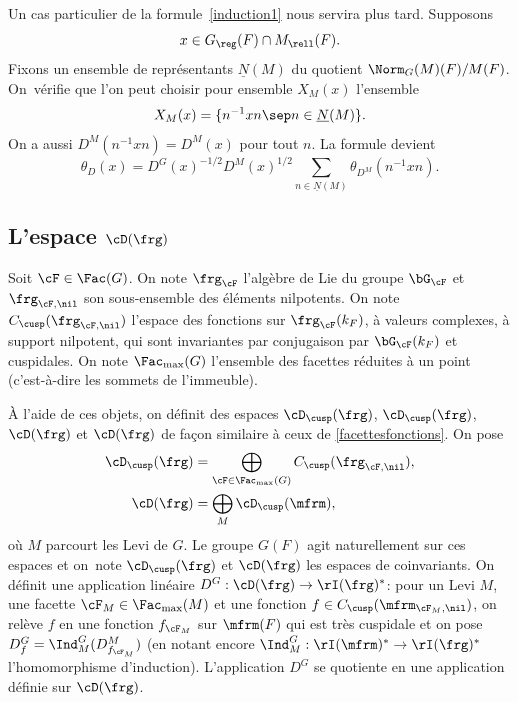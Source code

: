 Un cas particulier de la formule~\eqref{induction1} nous servira plus tard. Supposons
\[
x\in G_{\reg}(F)\cap M_{\rell}(F).
\]
Fixons un ensemble de représentants $\underline{N}(M)$ du quotient $\Norm_{G}(M)(F)/ M(F)$. On~véri\-fie que l'on peut choisir pour ensemble $X_{M}(x)$ l'ensemble
\[
X_{M}(x)=\{n^{-1}xn\sep n\in \underline{N}(M)\}.
\]
On a aussi $D^M(n^{-1}xn)=D^M(x)$ pour tout $n$. La formule devient
\begin{equation}\tag{3}\label{induction3}
\theta_{D}(x)=D^G(x)^{-1/2}D^M(x)^{1/2}\sum_{n\in \underline{N}(M)}\theta_{D^M}(n^{-1}xn).
\end{equation}

\subsection{L'espace \texorpdfstring{$\cD(\frg)$}{Dg}}\label{lespace}

Soit $\cF\in \Fac(G)$. On note $\boldsymbol{\frg}_{\cF}$ l'algèbre de Lie du groupe $\bG_{\cF}$ et $\boldsymbol{\frg}_{\cF,\nil}$ son sous-ensemble des éléments nilpotents. On note $C_{\cusp}(\boldsymbol{\frg}_{\cF,\nil})$ l'espace des fonctions sur $\boldsymbol{\frg}_{\cF}(k_{F})$, à valeurs complexes, à support nilpotent, qui sont invariantes par conjugaison par $\bG_{\cF}(k_{F})$ et cuspidales. On note $\Fac_{\max}(G)$ l'ensemble des facettes réduites à un point (c'est-à-dire les sommets de l'immeuble).

À l'aide de ces objets, on définit des espaces $\boldsymbol{\cD}_{\cusp}(\frg)$, $\cD_{\cusp}(\frg)$, $\boldsymbol{\cD}(\frg)$ et $\cD(\frg)$ de façon similaire à ceux de \ref{facettesfonctions}. On pose\vspace*{-3pt}
\begin{align*}
\boldsymbol{\cD}_{\cusp}(\frg)&=\bigoplus_{\cF\in \Fac_{\max}(G)}C_{\cusp}(\boldsymbol{\frg}_{\cF,\nil}),
\\
\boldsymbol{\cD}(\frg)&=\bigoplus_{M}\boldsymbol{\cD}_{\cusp}(\mfrm),
\end{align*}
où $M$ parcourt les Levi de $G$. Le groupe $G(F)$ agit naturellement sur ces espaces et on~note $\cD_{\cusp}(\frg)$ et $\cD(\frg)$ les espaces de coinvariants. On définit une application linéaire $D^G:\boldsymbol{\cD}(\frg)\to \rI(\frg)^*$: pour un Levi $M$, une facette $\cF_{M}\in \Fac_{\max}(M)$ et une fonction $f\in C_{\cusp}(\boldsymbol{\mfrm}_{\cF_{M},\nil})$, on relève $f$ en une fonction $f_{\cF_{M}}$ sur $\mfrm(F)$ qui est très cuspidale et on pose $D^G_{f}=\Ind_{M}^G(D^M_{f_{\cF_{M}}})$ (en notant encore $\Ind_{M}^G:\rI(\mfrm)^*\to \rI(\frg)^*$ l'homomorphisme d'induction). L'application $D^G$ se quotiente en une application définie sur $\cD(\frg)$.

